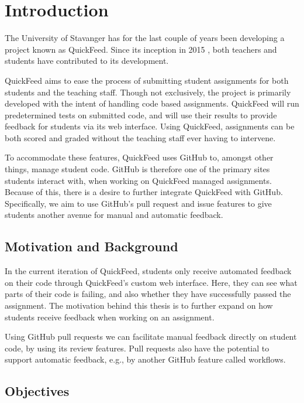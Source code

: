 
\chapter{Introduction}
\label{ch:intro}

The University of Stavanger has for the last couple of years been developing a project known as QuickFeed.
Since its inception in 2015 \cite{autograder}, both teachers and students have contributed to its development.

QuickFeed aims to ease the process of submitting student assignments for both students and the teaching staff.
Though not exclusively, the project is primarily developed with the intent of handling code based assignments.
QuickFeed will run predetermined tests on submitted code, and will use their results to provide feedback for students via its web interface.
Using QuickFeed, assignments can be both scored and graded without the teaching staff ever having to intervene.

To accommodate these features, QuickFeed uses GitHub to, amongst other things, manage student code.
GitHub is therefore one of the primary sites students interact with, when working on QuickFeed managed assignments.
Because of this, there is a desire to further integrate QuickFeed with GitHub.
Specifically, we aim to use GitHub's pull request and issue features to give students another avenue for manual and automatic feedback.

\section{Motivation and Background}
\label{sec:motivation}

In the current iteration of QuickFeed, students only receive automated feedback on their code through QuickFeed's custom web interface.
Here, they can see what parts of their code is failing, and also whether they have successfully passed the assignment.
The motivation behind this thesis is to further expand on how students receive feedback when working on an assignment.

Using GitHub pull requests we can facilitate manual feedback directly on student code, by using its review features.
Pull requests also have the potential to support automatic feedback, e.g., by another GitHub feature called workflows.

\section{Objectives}

